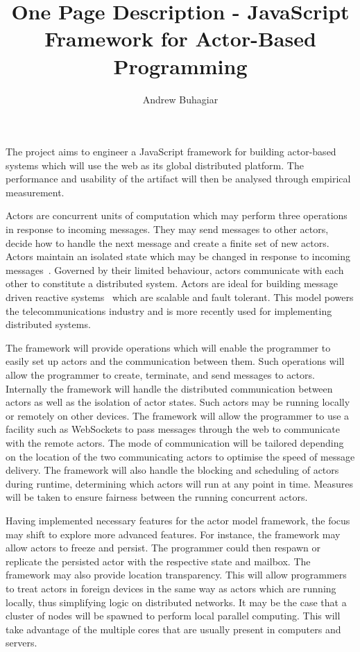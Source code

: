 \documentclass[12pt]{report}
\author{Andrew Buhagiar}
\title{One Page Description - JavaScript Framework for Actor-Based Programming}
\begin{document}
\maketitle
The project aims to engineer a JavaScript framework for building actor-based systems which will use the web as its global distributed platform. The performance and usability of the artifact will then be analysed through empirical measurement.

Actors are concurrent units of computation which may perform three operations in response to incoming messages. They may send messages to other actors, decide how to handle the next message and create a finite set of new actors. Actors maintain an isolated state which may be changed in response to incoming messages~\cite{agha_1985}. Governed by their limited behaviour, actors communicate with each other to constitute a distributed system. Actors are ideal for building message driven reactive systems~\cite{reactivemanifesto} which are scalable and fault tolerant. This model powers the telecommunications industry and is more recently used for implementing distributed systems.

The framework will provide operations which will enable the programmer to easily set up actors and the communication between them. Such operations will allow the programmer to create, terminate, and send messages to actors. Internally the framework will handle the distributed communication between actors as well as the isolation of actor states. Such actors may be running locally or remotely on other devices. The framework will allow the programmer to use a facility such as WebSockets to pass messages through the web to communicate with the remote actors. The mode of communication will be tailored depending on the location of the two communicating actors to optimise the speed of message delivery. The framework will also handle the blocking and scheduling of actors during runtime, determining which actors will run at any point in time. Measures will be taken to ensure fairness between the running concurrent actors.

Having implemented necessary features for the actor model framework, the focus may shift to explore more advanced features. For instance, the framework may allow actors to freeze and persist. The programmer could then respawn or replicate the persisted actor with the respective state and mailbox. The framework may also provide location transparency. This will allow programmers to treat actors in foreign devices in the same way as actors which are running locally, thus simplifying logic on distributed networks. It may be the case that a cluster of nodes will be spawned to perform local parallel computing. This will take advantage of the multiple cores that are usually present in computers and servers.
\end{document}
